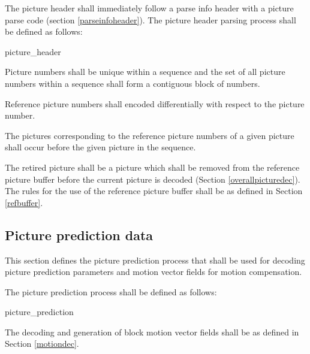 The picture header shall immediately follow a parse info header with a picture parse 
code (section \ref{parseinfoheader}). The picture header parsing process shall be defined as follows:

\begin{pseudo}{picture\_header}{}
    \bsEND\bsEND
{}
\bsEND
\end{pseudo}

Picture numbers shall be unique within a sequence and the set of all picture numbers
within a sequence shall form a contiguous block of numbers.

Reference picture numbers shall encoded differentially with respect to the
picture number.

The pictures corresponding to the reference picture numbers of a given picture
shall occur before the given picture in the sequence.

The retired picture shall be a picture which shall be removed from 
the reference picture buffer before the current picture is decoded
(Section \ref{overallpicturedec}). The rules for the 
use of the reference picture buffer shall be as defined in Section \ref{refbuffer}.

\subsection{Picture prediction data}
\label{pictureprediction}

This section defines the picture prediction process that shall be used for decoding 
picture prediction parameters and motion vector fields for motion compensation.

The picture prediction process shall be defined as follows:

\begin{pseudo}{picture\_prediction}{}
\end{pseudo}

The decoding and generation of block motion vector fields shall be as defined in Section \ref{motiondec}. 

